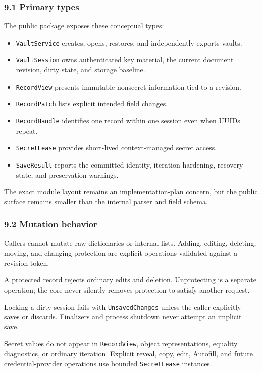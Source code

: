 \documentclass[
  letterpaper,
]{article}
\providecommand{\tightlist}{%
  \setlength{\itemsep}{0pt}\setlength{\parskip}{0pt}}
\begin{document}
\subsubsection{9.1 Primary types}\label{91-primary-types}

The public package exposes these conceptual types:

\begin{itemize}
\tightlist
\item
  \nolinkurl{VaultService} creates, opens, restores, and independently exports vaults.
\item
  \nolinkurl{VaultSession} owns authenticated key material, the current document revision, dirty state, and storage
  baseline.
\item
  \nolinkurl{RecordView} presents immutable nonsecret information tied to a revision.
\item
  \nolinkurl{RecordPatch} lists explicit intended field changes.
\item
  \nolinkurl{RecordHandle} identifies one record within one session even when UUIDs repeat.
\item
  \nolinkurl{SecretLease} provides short-lived context-managed secret access.
\item
  \nolinkurl{SaveResult} reports the committed identity, iteration hardening, recovery state, and preservation warnings.
\end{itemize}

The exact module layout remains an implementation-plan concern, but the public surface remains smaller than the internal
parser and field schema.

\subsubsection{9.2 Mutation behavior}\label{92-mutation-behavior}

Callers cannot mutate raw dictionaries or internal lists. Adding, editing, deleting, moving, and changing protection are
explicit operations validated against a revision token.

A protected record rejects ordinary edits and deletion. Unprotecting is a separate operation; the core never silently
removes protection to satisfy another request.

Locking a dirty session fails with \nolinkurl{UnsavedChanges} unless the caller explicitly saves or discards. Finalizers
and process shutdown never attempt an implicit save.

Secret values do not appear in \nolinkurl{RecordView}, object representations, equality diagnostics, or ordinary
iteration. Explicit reveal, copy, edit, Autofill, and future credential-provider operations use bounded
\nolinkurl{SecretLease} instances.
\end{document}
